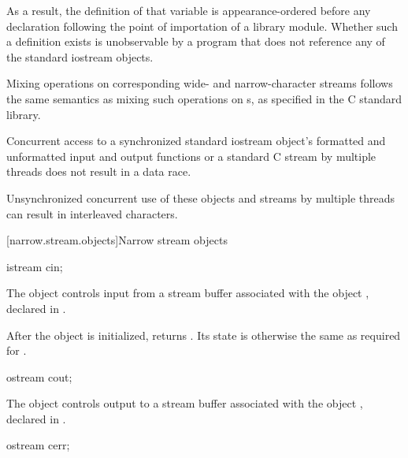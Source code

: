 \begin{note}
As a result, the definition of that variable is appearance-ordered before
any declaration following the point of importation of a \Cpp{} library module.
Whether such a definition exists is unobservable by a program that
does not reference any of the standard iostream objects.
\end{note}

\pnum
Mixing operations on corresponding wide- and narrow-character streams
follows the same semantics as mixing such operations on
s,
as specified in the C standard library.

\pnum
Concurrent access to a synchronized standard iostream object's formatted and unformatted input and output functions or a standard C stream by multiple threads does not result in a data race.
\begin{note}
Unsynchronized concurrent use of these objects and streams by multiple threads
can result in interleaved characters.
\end{note}


[narrow.stream.objects]{Narrow stream objects}

%
\begin{itemdecl}
istream cin;
\end{itemdecl}

\begin{itemdescr}
\pnum
The object 
controls input from a stream buffer associated with the object ,
declared in .

\pnum
After the object
is initialized,
returns
.
Its state is otherwise the same as required for
.
\end{itemdescr}

%
\begin{itemdecl}
ostream cout;
\end{itemdecl}

\begin{itemdescr}
\pnum
The object 
controls output to a stream buffer associated with the object ,
declared in .
\end{itemdescr}

%
\begin{itemdecl}
ostream cerr;
\end{itemdecl}


